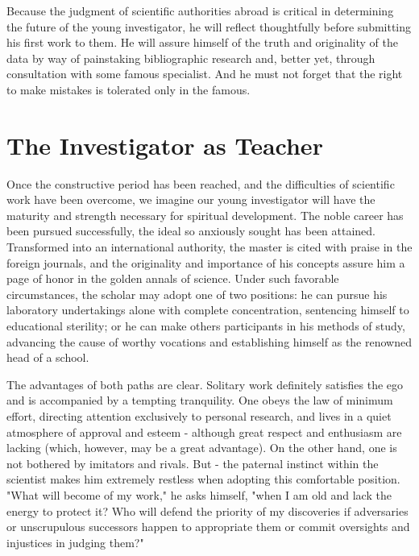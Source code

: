\documentclass{article}
\begin{document}
Because the judgment of scientific authorities abroad is critical in determining the future of the young investigator, he will reflect thoughtfully before submitting his first work to them. He will assure himself of the truth and originality of the data by way of painstaking bibliographic research and, better yet, through consultation with some famous specialist. And he must not forget that the right to make mistakes is tolerated only in the famous.

\newpage \section{The Investigator as Teacher}

Once the constructive period has been reached, and the difficulties of scientific work have been overcome, we imagine our young investigator will have the maturity and strength necessary for spiritual development. The noble career has been pursued successfully, the ideal so anxiously sought has been attained. Transformed into an international authority, the master is cited with praise in the foreign journals, and the originality and importance of his concepts assure him a page of honor in the golden annals of science. Under such favorable circumstances, the scholar may adopt one of two positions: he can pursue his laboratory undertakings alone with complete concentration, sentencing himself to educational sterility; or he can make others participants in his methods of study, advancing the cause of worthy vocations and establishing himself as the renowned head of a school.

The advantages of both paths are clear. Solitary work definitely satisfies the ego and is accompanied by a tempting tranquility. One obeys the law of minimum effort, directing attention exclusively to personal research, and lives in a quiet atmosphere of approval and esteem - although great respect and enthusiasm are lacking (which, however, may be a great advantage). On the other hand, one is not bothered by imitators and rivals. But - the paternal instinct within the scientist makes him extremely restless when adopting this comfortable position. "What will become of my work," he asks himself, "when I am old and lack the energy to protect it? Who will defend the priority of my discoveries if adversaries or unscrupulous successors happen to appropriate them or commit oversights and injustices in judging them?"
\end{document}
